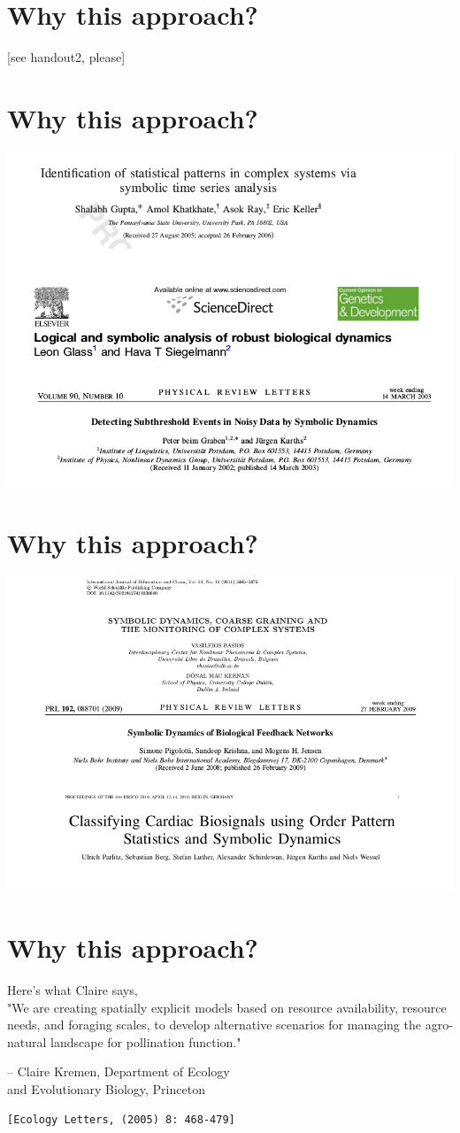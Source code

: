 \documentclass[
paper=128mm:96mm, %
fontsize=11pt, %
pagesize, %
parskip=half-, %
]{scrartcl} %
\theoremstyle{mythmstyle} %
\begin{document}
\clearpage
\section{Why this approach?}
\normalsize 
[see handout2, please]
\clearpage
\section{Why this approach?}
\centering \includegraphics[height=5.75 cm]{Image21.jpg}
\clearpage
\section{Why this approach?}
\centering \includegraphics[height=5.5 cm]{Image22.jpg}
\clearpage
\section{Why this approach?}

\begin{flushleft}
Here's what Claire says,\\
"We are creating spatially explicit models based on resource availability, resource needs, and foraging scales, to develop alternative scenarios for managing the agro-natural landscape for pollination function."
\end{flushleft}
\begin{flushright}
-- Claire Kremen, Department of Ecology \\
and Evolutionary Biology, Princeton
\begin{verbatim}
[Ecology Letters, (2005) 8: 468-479]
\end{verbatim}
\end{flushright}
\end{document}
